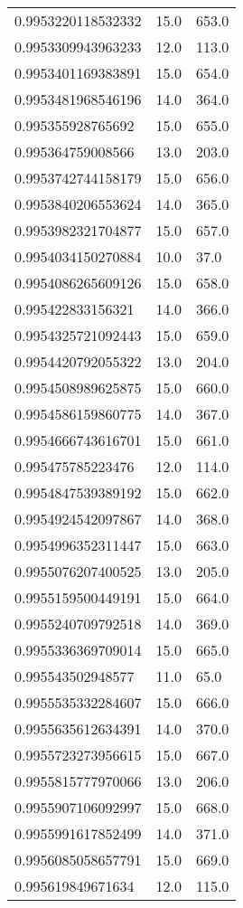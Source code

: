 \begin{center}
\begin{supertabular}[H]{p{0.30\textwidth}p{0.05\textwidth}p{0.05\textwidth}}
0.9953220118532332 & 15.0 & 653.0 \\ 
0.9953309943963233 & 12.0 & 113.0 \\ 
0.9953401169383891 & 15.0 & 654.0 \\ 
0.9953481968546196 & 14.0 & 364.0 \\ 
0.995355928765692 & 15.0 & 655.0 \\ 
0.995364759008566 & 13.0 & 203.0 \\ 
0.9953742744158179 & 15.0 & 656.0 \\ 
0.9953840206553624 & 14.0 & 365.0 \\ 
0.9953982321704877 & 15.0 & 657.0 \\ 
0.9954034150270884 & 10.0 & 37.0 \\ 
0.9954086265609126 & 15.0 & 658.0 \\ 
0.995422833156321 & 14.0 & 366.0 \\ 
0.9954325721092443 & 15.0 & 659.0 \\ 
0.9954420792055322 & 13.0 & 204.0 \\ 
0.9954508989625875 & 15.0 & 660.0 \\ 
0.9954586159860775 & 14.0 & 367.0 \\ 
0.9954666743616701 & 15.0 & 661.0 \\ 
0.995475785223476 & 12.0 & 114.0 \\ 
0.9954847539389192 & 15.0 & 662.0 \\ 
0.9954924542097867 & 14.0 & 368.0 \\ 
0.9954996352311447 & 15.0 & 663.0 \\ 
0.9955076207400525 & 13.0 & 205.0 \\ 
0.9955159500449191 & 15.0 & 664.0 \\ 
0.9955240709792518 & 14.0 & 369.0 \\ 
0.9955336369709014 & 15.0 & 665.0 \\ 
0.995543502948577 & 11.0 & 65.0 \\ 
0.9955535332284607 & 15.0 & 666.0 \\ 
0.9955635612634391 & 14.0 & 370.0 \\ 
0.9955723273956615 & 15.0 & 667.0 \\ 
0.9955815777970066 & 13.0 & 206.0 \\ 
0.9955907106092997 & 15.0 & 668.0 \\ 
0.9955991617852499 & 14.0 & 371.0 \\ 
0.9956085058657791 & 15.0 & 669.0 \\ 
0.995619849671634 & 12.0 & 115.0 \\ 

\end{supertabular}
\end{center}

